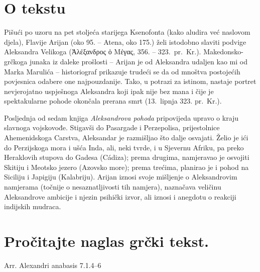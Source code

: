 


\section*{O tekstu}

Pišući po uzoru na pet stoljeća starijega Ksenofonta (kako aludira već naslovom djela), Flavije Arijan (oko 95. – Atena, oko 175.) želi istodobno slaviti podvige Aleksandra Velikoga (Ἀλέξανδρος ὁ Μέγας, 356. – 323.\ pr.~Kr.). Makedonsko-grčkoga junaka iz daleke prošlosti – Arijan je od Aleksandra udaljen kao mi od Marka Marulića – historiograf prikazuje trudeći se da od mnoštva postojećih povjesnica odabere one najpouzdanije. Tako, u potrazi za istinom, nastaje portret nevjerojatno uspješnoga Aleksandra koji ipak nije bez mana i čije je spektakularne pohode okončala prerana smrt (13.\ lipnja 323. pr.~Kr.).

Posljednja od sedam knjiga \textit{Aleksandrova pohoda} pripovijeda upravo o kraju slavnoga vojskovođe. Stigavši do Pasargade i Perzepolisa, prijestolnice Ahemenidskoga Carstva, Aleksandar je razmišljao što dalje osvajati. Želio je ići do Perzijskoga mora i ušća Inda, ali, neki tvrde, i u Sjevernu Afriku, pa preko Heraklovih stupova do Gadesa (Cádiza); prema drugima, namjeravao je osvojiti Skitiju i Meotsko jezero (Azovsko more); prema trećima, planirao je i pohod na Siciliju i Japigiju (Kalabriju). Arijan iznosi svoje mišljenje o Aleksandrovim namjerama (točnije o nesaznatljivosti tih namjera), naznačava veličinu Aleksandrove ambicije i njezin psihički izvor, ali iznosi i anegdotu o reakciji indijskih mudraca.

\newpage

\section*{Pročitajte naglas grčki tekst.}

Arr. Alexandri anabasis 7.1.4–6


\medskip


